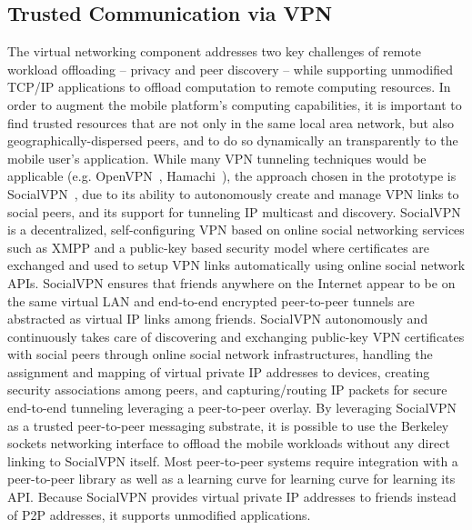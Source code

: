\subsection{Trusted Communication via VPN}
%
\label{offloading:vpn}
The virtual networking component addresses two key challenges of remote
workload offloading -- privacy and peer discovery -- while supporting
unmodified TCP/IP applications to offload computation to remote
computing resources.
%
In order to augment the mobile platform's computing capabilities, it is
important to find trusted resources that are not only in the same local
area network, but also geographically-dispersed peers, and to do so
dynamically an transparently to the mobile user's application.
%
While many VPN tunneling techniques would be applicable (e.g.
OpenVPN~\cite{openvpn}, Hamachi~\cite{hamachi}), the approach chosen in
the prototype is SocialVPN~\cite{socialvpn}, due to its ability to
autonomously create and manage VPN links to social peers, and its
support for tunneling IP multicast and discovery.
%
SocialVPN is a decentralized, self-configuring VPN based on online
social networking services such as XMPP and a public-key based security
model where certificates are exchanged and used to setup VPN links
automatically using online social network APIs.
%
SocialVPN ensures that friends anywhere on the Internet appear to be on
the same virtual LAN and end-to-end encrypted peer-to-peer tunnels are
abstracted as virtual IP links among friends.
%
SocialVPN  autonomously and continuously takes care of discovering and
exchanging public-key VPN certificates with social peers through online
social network infrastructures, handling the assignment and mapping of
virtual private IP addresses to devices, creating security associations
among peers, and capturing/routing IP packets for secure end-to-end
tunneling leveraging a peer-to-peer overlay.
%
By leveraging SocialVPN as a trusted peer-to-peer messaging substrate,
it is possible to use the Berkeley sockets networking interface to
offload the mobile workloads without any direct linking to SocialVPN
itself.
%
Most peer-to-peer systems require integration with a peer-to-peer
library as well as a learning curve for learning curve for learning its
API.
%
Because SocialVPN provides virtual private IP addresses to friends
instead of P2P addresses, it supports unmodified applications.
%

